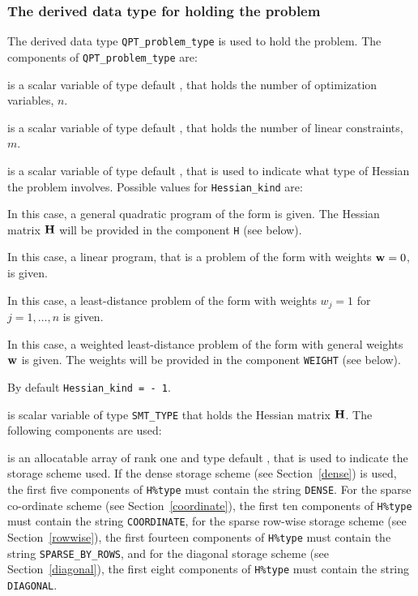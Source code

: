 \documentclass{galahad}
\begin{document}

\subsubsection{The derived data type for holding the problem}\label{typeprob}
The derived data type {\tt QPT\_problem\_type} is used to hold 
the problem. The components of 
{\tt QPT\_problem\_type} 
are:

\begin{description}

 is a scalar variable of type default \integer, 
 that holds the number of optimization variables, $n$.  
              
 is a scalar variable of type default \integer, 
 that holds the number of linear constraints, $m$.
              
 is a scalar variable of type default \integer, 
that is used to indicate what type of Hessian the problem involves.
Possible values for {\tt Hessian\_kind} are:

\begin{description}
  In this case, a general quadratic program of the form
 is given. The Hessian matrix ${\mathbf{H}}$ will be provided in the 
component {\tt H} (see below).

  In this case, a linear program, that is a problem of the form 
 with weights ${\mathbf{w}} = 0$, is given.

 In this case, a least-distance problem of the form 
with weights $w_{j} = 1$ for $j = 1, \ldots , n$ is given.

 In this case, a weighted least-distance problem of the form 
with general weights ${\mathbf{w}}$ is given. The weights will be
provided in the component {\tt WEIGHT} (see below).
\end{description}
By default {\tt Hessian\_kind = - 1}.

 is scalar variable of type {\tt SMT\_TYPE} 
that holds the Hessian matrix ${\mathbf{H}}$. The following components
are used:

\begin{description}

 is an allocatable array of rank one and type default \character, that
is used to indicate the storage scheme used. If the dense storage scheme 
(see Section~\ref{dense}) is used, 
the first five components of {\tt H\%type} must contain the
string {\tt DENSE}.
For the sparse co-ordinate scheme (see Section~\ref{coordinate}), 
the first ten components of {\tt H\%type} must contain the
string {\tt COORDINATE},  
for the sparse row-wise storage scheme (see Section~\ref{rowwise}),
the first fourteen components of {\tt H\%type} must contain the
string {\tt SPARSE\_BY\_ROWS},
and for the diagonal storage scheme (see Section~\ref{diagonal}),
the first eight components of {\tt H\%type} must contain the
string {\tt DIAGONAL}.


\end{description}
\end{description}
\end{document}
